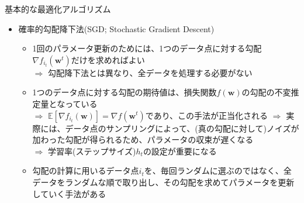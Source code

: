 \documentclass[dvipdfmx,notheorems,t]{beamer}
\begin{document}
\begin{frame}{基本的な最適化アルゴリズム}

\begin{itemize}
	\item 確率的勾配降下法(SGD; Stochastic Gradient Descent)
	\begin{itemize}
		\item 1回のパラメータ更新のためには、1つのデータ点に対する勾配$\nabla f_{i_t}(\bm{w}^t)$だけを求めればよい \\
		$\Rightarrow$ 勾配降下法とは異なり、全データを処理する必要がない
		\newline
		
		\item 1つのデータ点に対する勾配の期待値は、損失関数$f(\bm{w})$の勾配の不変推定量となっている \\
		$\Rightarrow$ $\mathbb{E} \left[ \nabla f_{i_t}(\bm{w}) \right] = \nabla f(\bm{w}^t)$であり、この手法が正当化される \newline \newline
		$\Rightarrow$ 実際には、データ点のサンプリングによって、(真の勾配に対して)ノイズが加わった勾配が得られるため、パラメータの収束が遅くなる \\
		$\Rightarrow$ 学習率(ステップサイズ)$h_t$の設定が重要になる
		\newline
		
		\item 勾配の計算に用いるデータ点$i_t$を、毎回ランダムに選ぶのではなく、全データをランダムな順で取り出し、その勾配を求めてパラメータを更新していく手法がある
	\end{itemize}
\end{itemize}

\end{frame}
\end{document}
